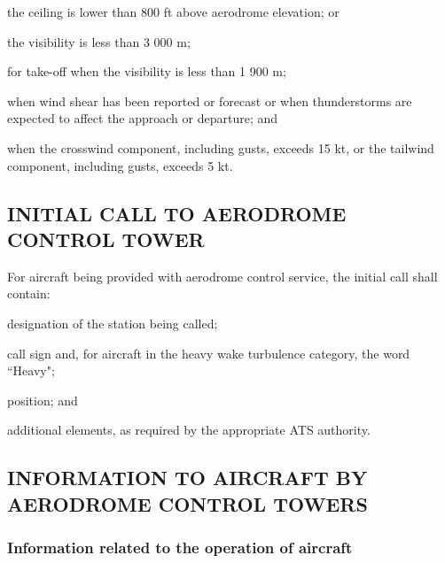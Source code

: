 \begin{enumnoss}
\begin{enumalph}
\begin{enumarab}
            \begin{enumroman}
                \item the ceiling is lower than 800 ft above aerodrome elevation; or
                \item the visibility is less than 3 000 m;
            \end{enumroman}
        \end{enumarab}

        \item for take-off when the visibility is less than 1 900 m;
        \item when wind shear has been reported or forecast or when thunderstorms are expected to affect the approach or departure; and
        \item when the crosswind component, including gusts, exceeds 15 kt, or the tailwind component, including gusts, exceeds 5 kt.
    \end{enumalph}
\end{enumnoss}

\subsection[Initial call to aerodrome control tower]{INITIAL CALL TO AERODROME CONTROL TOWER}

For aircraft being provided with aerodrome control service, the initial call shall contain:

\begin{enumalph}
    \item designation of the station being called;
    \item call sign and, for aircraft in the heavy wake turbulence category, the word ``Heavy";
    \item position; and
    \item additional elements, as required by the appropriate ATS authority.
\end{enumalph}


\subsection[Information to aircraft by aerodrome control towers]{INFORMATION TO AIRCRAFT BY AERODROME CONTROL TOWERS}

\subsubsection{Information related to the operation of aircraft}

